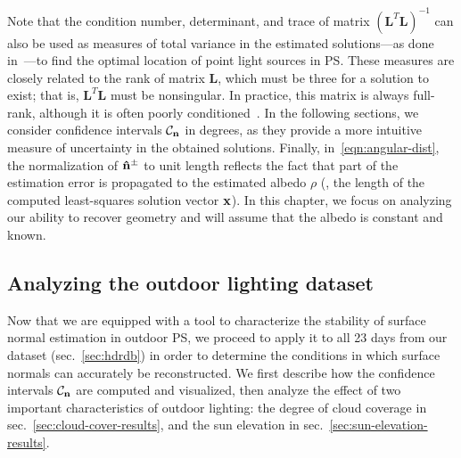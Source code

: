Note that the condition number, determinant, and trace of matrix $(\mathbf{L}^T\mathbf{L})^{-1}$ can also be used as measures of total variance in the estimated solutions---as done in~\cite{sun-ivc-07}---to find the optimal location of point light sources in PS. These measures are closely related to the rank of matrix $\mathbf{L}$, which must be three for a solution to exist; that is, $\mathbf{L}^T\mathbf{L}$ must be nonsingular. In practice, this matrix is always full-rank, although it is often poorly conditioned~\cite{shen-pg-14}. In the following sections, we consider confidence intervals $\mathcal{C}_{\bf n}$ in degrees, as they provide a more intuitive measure of uncertainty in the obtained solutions. Finally, in~\eqref{eqn:angular-dist}, the normalization of ${\bf \hat n}^\pm$ to unit length reflects the fact that part of the estimation error is propagated to the estimated albedo $\rho$ (\ie, the length of the computed least-squares solution vector ${\bf x}$). In this chapter, we focus on analyzing our ability to recover geometry and will assume that the albedo is constant and known.

\subsection{Analyzing the outdoor lighting dataset}
\label{sec:iccp15-datasetanalysis}

Now that we are equipped with a tool to characterize the stability of surface normal estimation in outdoor PS, we proceed to apply it to all 23 days from our dataset (sec.~\ref{sec:hdrdb}) in order to determine the conditions in which surface normals can accurately be reconstructed. We first describe how the confidence intervals $\mathcal{C}_{\bf n}$ are computed and visualized, then analyze the effect of two important characteristics of outdoor lighting: the degree of cloud coverage in sec.~\ref{sec:cloud-cover-results}, and the sun elevation in sec.~\ref{sec:sun-elevation-results}.

